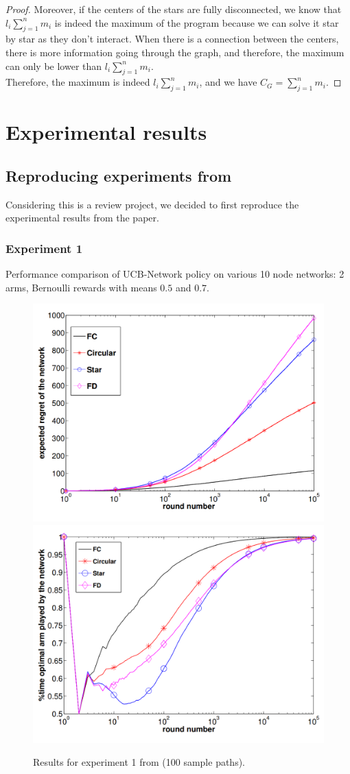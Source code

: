 \documentclass{article}
\begin{document}
\begin{proof}
Moreover, if the centers of the stars are fully disconnected, we know that $l_i \sum_{j=1}^n m_i$ is indeed the maximum of the program because we can solve it star by star as they don't interact. When there is a connection between the centers, there is more information going through the graph, and therefore, the maximum can only be lower than $l_i \sum_{j=1}^n m_i$. \\

Therefore, the maximum is indeed $l_i \sum_{j=1}^n m_i$, and we have $C_G = \sum_{j=1}^n m_i$.


\end{proof}


\newpage

\section{Experimental results}

\subsection{Reproducing experiments from \cite{DBLP:journals/corr/KollaJG16}}

Considering this is a review project, we decided to first reproduce the experimental results from the paper.

\subsubsection{Experiment 1}

Performance comparison of UCB-Network policy on various 10 node networks: 2 arms, Bernoulli rewards with means $0.5$ and $0.7$.

\begin{figure}[H]
  \centering
  \includegraphics[width=0.49\linewidth]{fig1_1.png}
  \includegraphics[width=0.49\linewidth]{fig1_2.png}
  \caption{Results for experiment 1 from \cite{DBLP:journals/corr/KollaJG16} (100 sample paths).}
\end{figure}
\end{document}
